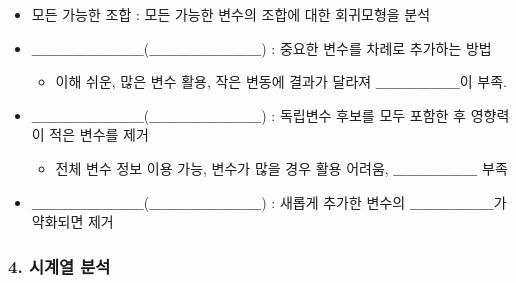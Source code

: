 \documentclass[11pt]{article}
\providecommand{\tightlist}{%
      \setlength{\itemsep}{0pt}\setlength{\parskip}{0pt}}
\begin{document}
\begin{enumerate}
  \begin{itemize}
  \tightlist
  \item
    모든 가능한 조합 : 모든 가능한 변수의 조합에 대한 회귀모형을 분석
  \item
    ＿＿＿＿＿＿＿＿(＿＿＿＿＿＿＿＿) : 중요한 변수를 차례로 추가하는
    방법

    \begin{itemize}
    \tightlist
    \item
      이해 쉬운, 많은 변수 활용, 작은 변동에 결과가 달라져
      ＿＿＿＿＿＿이 부족.
    \end{itemize}
  \item
    ＿＿＿＿＿＿＿＿(＿＿＿＿＿＿＿＿) : 독립변수 후보를 모두 포함한 후
    영향력이 적은 변수를 제거

    \begin{itemize}
    \tightlist
    \item
      전체 변수 정보 이용 가능, 변수가 많을 경우 활용 어려움,
      ＿＿＿＿＿＿ 부족
    \end{itemize}
  \item
    ＿＿＿＿＿＿＿＿(＿＿＿＿＿＿＿＿) : 새롭게 추가한 변수의
    ＿＿＿＿＿＿가 약화되면 제거
  \end{itemize}
\end{enumerate}

    \hypertarget{uxc2dcuxacc4uxc5f4-uxbd84uxc11d}{%
\subsubsection{4. 시계열 분석}\label{uxc2dcuxacc4uxc5f4-uxbd84uxc11d}}
\end{document}
